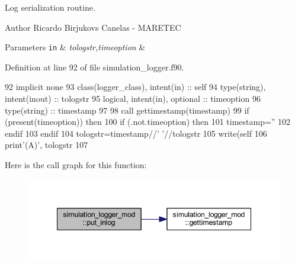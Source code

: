 Log serialization routine. 

\begin{DoxyAuthor}{Author}
Ricardo Birjukovs Canelas -\/ M\+A\+R\+E\+T\+EC
\end{DoxyAuthor}

\begin{DoxyParams}[1]{Parameters}
\mbox{\tt in}  & {\em tologstr,timeoption} & \\
\hline
\end{DoxyParams}


Definition at line 92 of file simulation\+\_\+logger.\+f90.


\begin{DoxyCode}
92     \textcolor{keywordtype}{implicit none}
93     \textcolor{keywordtype}{class}(logger\_class), \textcolor{keywordtype}{intent(in)} :: self
94     \textcolor{keywordtype}{type}(string), \textcolor{keywordtype}{intent(inout)} :: tologstr
95     \textcolor{keywordtype}{logical}, \textcolor{keywordtype}{intent(in)}, \textcolor{keywordtype}{optional} :: timeoption
96     \textcolor{keywordtype}{type}(string) :: timestamp
97     
98     \textcolor{keyword}{call }gettimestamp(timestamp)
99     \textcolor{keywordflow}{if} (\textcolor{keyword}{present}(timeoption)) \textcolor{keywordflow}{then}
100       \textcolor{keywordflow}{if} (.not.timeoption) \textcolor{keywordflow}{then}
101         timestamp=\textcolor{stringliteral}{''}
102 \textcolor{keywordflow}{      endif}
103 \textcolor{keywordflow}{    endif}
104     tologstr=timestamp//\textcolor{stringliteral}{' '}//tologstr
105     \textcolor{keyword}{write}(self%
106     print\textcolor{stringliteral}{'(A)'}, tologstr%
107     
\end{DoxyCode}
Here is the call graph for this function\+:\nopagebreak
\begin{figure}[H]
\begin{center}
\leavevmode
\includegraphics[width=348pt]{namespacesimulation__logger__mod_a34980631cfcf2d2172aa3b491acace4c_cgraph}
\end{center}
\end{figure}


